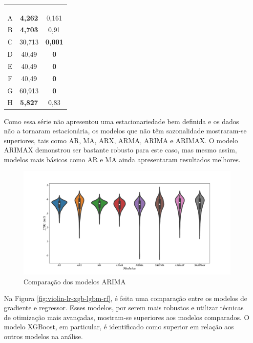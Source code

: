 \begin{table}[!htb]
\begin{subtable}{0.45\linewidth}
\begin{tabular}{@{}ccc@{}}
			& & \\
			& & \\
			& & \\ \midrule
			A & \textbf{4,262} & 0,161 \\
			B & \textbf{4,703} & 0,91 \\
			C & 30,713 & \textbf{0,001} \\
			D & 40,49 & \textbf{0} \\
			E & 40,49 & \textbf{0} \\
			F & 40,49 & \textbf{0} \\
			G & 60,913 & \textbf{0} \\
			H & \textbf{5,827} & 0,83 \\ \bottomrule
		\end{tabular}
	\end{subtable}
	
	
	\vspace{0.5cm}
	
\end{table}

Como essa série não apresentou uma estacionariedade bem definida e os dados não a tornaram estacionária, os modelos que não têm sazonalidade mostraram-se superiores, tais como AR, MA, ARX, ARMA, ARIMA e ARIMAX. O modelo ARIMAX demonstrou ser bastante robusto para este caso, mas mesmo assim, modelos mais básicos como AR e MA ainda apresentaram resultados melhores.

\begin{figure}[!htb]
	\centering
	\caption{Comparação dos modelos ARIMA}\label{fig:modelos-arima}
	\includegraphics[width=1\linewidth]{Resultados/Figuras/modelos-arima}
	

\end{figure}

Na Figura \ref{fig:violin-lr-xgb-lgbm-rf}, é feita uma comparação entre os modelos de gradiente e regressor. Esses modelos, por serem mais robustos e utilizar técnicas de otimização mais avançadas, mostram-se superiores aos modelos comparados. O modelo XGBoost, em particular, é identificado como superior em relação aos outros modelos na análise.

